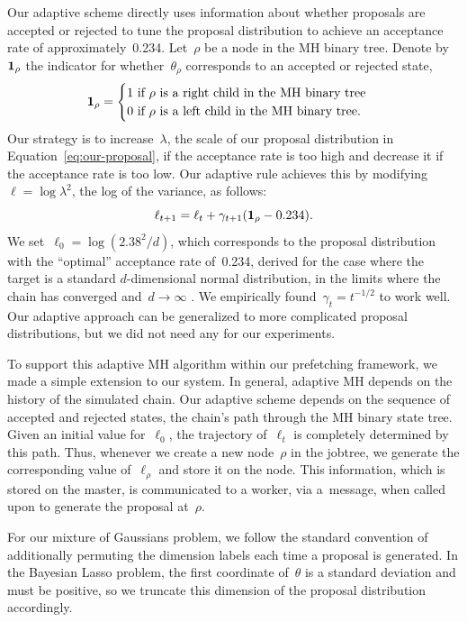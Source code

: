 \documentclass[angelino.tex]{subfiles}
\begin{document}
Our adaptive scheme directly uses information about whether proposals are
accepted or rejected to tune the proposal distribution to achieve an
acceptance rate of approximately~0.234.
Let~$\rho$ be a node in the MH binary tree.
Denote by~$\mathbf{1}_\rho$ the indicator for whether~$\theta_\rho$ corresponds to
an accepted or rejected state, \ie
\[
\mathbf{1}_\rho = \begin{cases}
1 \text{ if } \rho \text{ is a right child in the MH binary tree} \\
0 \text{ if } \rho \text{ is a left child in the MH binary tree}.
\end{cases}
\]
Our strategy is to increase~$\lambda$, the scale of our proposal distribution in 
Equation~\ref{eq:our-proposal}, if the acceptance rate is too high
and decrease it if the acceptance rate is too low.
Our adaptive rule achieves this by modifying~${\ell = \log{\lambda^2}}$,
the log of the variance, as follows:
\[
\ell_{t+1} = \ell_t + \gamma_{t+1} (\mathbf{1}_\rho - 0.234).
\]
We set~${\ell_0 = \log(2.38^2 / d)}$, which corresponds to the proposal
distribution with the ``optimal'' acceptance rate of~0.234, derived
for the case where the target is a standard {$d$-dimensional} normal distribution,
in the limits where the chain has converged
and~${d \rightarrow \infty}$ \citep{roberts-1997-accept}.
We empirically found~${\gamma_t = t^{-1/2}}$ to work well.
Our adaptive approach can be generalized to more complicated proposal
distributions, but we did not need any for our experiments.

To support this adaptive MH algorithm within our prefetching framework,
we made a simple extension to our system.
In general, adaptive MH depends on the history of the simulated chain.
Our adaptive scheme depends on the sequence of accepted and rejected states,
\ie the chain's path through the MH binary state tree.
Given an initial value for~$\ell_0$, the trajectory of~$\ell_t$
is completely determined by this path.
Thus, whenever we create a new node~$\rho$ in the jobtree,
we generate the corresponding value of~$\ell_\rho$ and store it on the node.
This information, which is stored on the master, is communicated to a worker,
via a~\HAVEWORK message, when called upon to generate the proposal at~$\rho$.

For our mixture of Gaussians problem, we follow the standard convention of
additionally permuting the dimension labels each time a proposal is generated.
In the Bayesian Lasso problem, the first coordinate of~$\theta$ is a standard
deviation and must be positive, so we truncate this dimension of the proposal
distribution accordingly.
\end{document}
